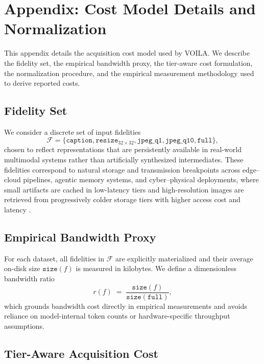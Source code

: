 \section{Appendix: Cost Model Details and Normalization}
\label{sec:cost_model}

This appendix details the acquisition cost model used by \textsc{VOILA}.
We describe the fidelity set, the empirical bandwidth proxy, the tier-aware
cost formulation, the normalization procedure, and the empirical measurement
methodology used to derive reported costs.

\subsection{Fidelity Set}
\label{sec:fidelity_set}

We consider a discrete set of input fidelities
\[
\mathcal{F}
=\{
\texttt{caption},
\texttt{resize}_{32\times32},
\texttt{jpeg\_q1},
\texttt{jpeg\_q10},
\texttt{full}
\},
\]
chosen to reflect representations that are persistently available in real-world
multimodal systems rather than artificially synthesized intermediates.
These fidelities correspond to natural storage and transmission breakpoints
across edge--cloud pipelines, agentic memory systems, and cyber--physical
deployments, where small artifacts are cached in low-latency tiers and
high-resolution images are retrieved from progressively colder storage tiers
with higher access cost and latency
\cite{aws_s3_storage_classes, gcs_storage_classes, azure_blob_storage}.

\subsection{Empirical Bandwidth Proxy}
\label{sec:bandwidth}

For each dataset, all fidelities in $\mathcal{F}$ are explicitly materialized
and their average on-disk size $\texttt{size}(f)$ is measured in kilobytes.
We define a dimensionless bandwidth ratio
\begin{equation}
r(f)
\;=\;
\frac{\texttt{size}(f)}{\texttt{size}(\texttt{full})},
\label{eq:ratio_def}
\end{equation}
which grounds bandwidth cost directly in empirical measurements and avoids
reliance on model-internal token counts or hardware-specific throughput
assumptions.

\subsection{Tier-Aware Acquisition Cost}
\label{sec:tier_cost}

